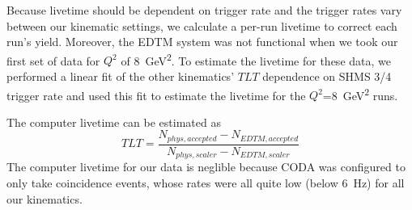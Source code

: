 Because livetime should be dependent on trigger rate and the trigger rates
vary between our kinematic settings, we calculate a per-run livetime to
correct each run's yield.
Moreover, the EDTM system was not functional when we took our first set of data
for $Q^2$ of \SI{8}{\giga\electronvolt\squared}.
To estimate the livetime for these data, we performed a linear fit of the other
kinematics' $TLT$ dependence on SHMS 3/4 trigger rate and used this fit to
estimate the livetime for the $Q^2$=\SI{8}{\giga\electronvolt\squared} runs.


The computer livetime can be estimated as
\begin{equation}
    TLT = \frac{N_{phys,accepted}-N_{EDTM,accepted}}{N_{phys,scaler}-N_{EDTM,scaler}}
\end{equation}
The computer livetime for our data is neglible because CODA was configured to
only take coincidence events, whose rates were all quite low (below
\SI{6}{\hertz}) for all our kinematics.



